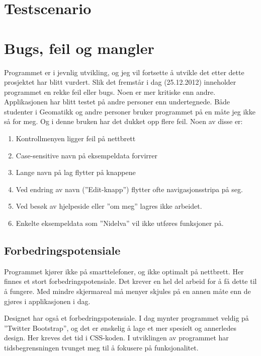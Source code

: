 \documentclass[12pt,twoside,onecolumn]{article}
\begin{document}
\section{Testscenario}


\section{Bugs, feil og mangler}

	Programmet er i jevnlig utvikling, og jeg vil fortsette å utvikle det etter dette prosjektet har blitt vurdert. Slik det fremstår i dag (25.12.2012) inneholder programmet en rekke feil eller bugs. Noen er mer kritiske enn andre. Applikasjonen har blitt testet på andre personer enn undertegnede. Både studenter i Geomatikk og andre personer bruker programmet på en måte jeg ikke så for meg. Og i denne bruken har det dukket opp flere feil. Noen av disse er:
	
	\begin{enumerate}
		\item Kontrollmenyen ligger feil på nettbrett
		\item Case-sensitive navn på eksempeldata forvirrer
		\item Lange navn på lag flytter på knappene
		\item Ved endring av navn (''Edit-knapp'') flytter ofte navigasjonsstripa på seg.
		\item Ved besøk av hjelpeside eller ''om meg'' lagres ikke arbeidet.
		\item Enkelte eksempeldata som ''Nidelva'' vil ikke utføres funksjoner på.
		
	\end{enumerate}
	
	
	\subsection{Forbedringspotensiale}
	
	Programmet kjører ikke på smarttelefoner, og ikke optimalt på nettbrett. Her finnes et stort forbedringspotensiale. Det krever en hel del arbeid for å få dette til å fungere. Med mindre skjermareal må menyer skjules på en annen måte enn de gjøres i applikasjonen i dag.
	
	Designet har også et forbedringspotensiale. I dag mynter programmet veldig på ''Twitter Bootstrap'', og det er ønskelig å lage et mer spesielt og annerledes design. Her kreves det tid i CSS-koden. I utviklingen av programmet har tidsbegrensningen tvunget meg til å fokusere på funksjonalitet.
	
\end{document}
